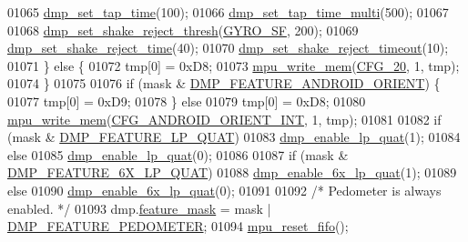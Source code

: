 \begin{DoxyCode}
01065         \hyperlink{group___d_r_i_v_e_r_s_ga97466067f4a23368f4d7e2547fe359d9}{dmp\_set\_tap\_time}(100);
01066         \hyperlink{group___d_r_i_v_e_r_s_gaeca250a90eb816eb2609229849481337}{dmp\_set\_tap\_time\_multi}(500);
01067 
01068         \hyperlink{group___d_r_i_v_e_r_s_ga62efdae1330d5bcaf4c75b069ded0ed0}{dmp\_set\_shake\_reject\_thresh}(\hyperlink{group___d_r_i_v_e_r_s_gac0325c658f2911bdfc3b44fca31c684f}{GYRO\_SF}, 200);
01069         \hyperlink{group___d_r_i_v_e_r_s_ga09d7a6d90e1bd2e907f1866d850c5608}{dmp\_set\_shake\_reject\_time}(40);
01070         \hyperlink{group___d_r_i_v_e_r_s_ga5d44d1a32535000e6902cdc5224d1b54}{dmp\_set\_shake\_reject\_timeout}(10);
01071     \} \textcolor{keywordflow}{else} \{
01072         tmp[0] = 0xD8;
01073         \hyperlink{group___d_r_i_v_e_r_s_gafea59910bc3dd30ba3356b1c75213a5f}{mpu\_write\_mem}(\hyperlink{group___d_r_i_v_e_r_s_ga12aa4c3bdc65c24ca29ef08e62fd3e13}{CFG\_20}, 1, tmp);
01074     \}
01075 
01076     \textcolor{keywordflow}{if} (mask & \hyperlink{group___d_r_i_v_e_r_s_gaf2b250fc928390d562f7bd80300ce419}{DMP\_FEATURE\_ANDROID\_ORIENT}) \{
01077         tmp[0] = 0xD9;
01078     \} \textcolor{keywordflow}{else}
01079         tmp[0] = 0xD8;
01080     \hyperlink{group___d_r_i_v_e_r_s_gafea59910bc3dd30ba3356b1c75213a5f}{mpu\_write\_mem}(\hyperlink{group___d_r_i_v_e_r_s_gacc91af9a664cf438b93a3faa108bb603}{CFG\_ANDROID\_ORIENT\_INT}, 1, tmp);
01081 
01082     \textcolor{keywordflow}{if} (mask & \hyperlink{group___d_r_i_v_e_r_s_gabf442c0477f8f7704a8094519ddfe38e}{DMP\_FEATURE\_LP\_QUAT})
01083         \hyperlink{group___d_r_i_v_e_r_s_ga4ee4339b79a58558d121ba8206056394}{dmp\_enable\_lp\_quat}(1);
01084     \textcolor{keywordflow}{else}
01085         \hyperlink{group___d_r_i_v_e_r_s_ga4ee4339b79a58558d121ba8206056394}{dmp\_enable\_lp\_quat}(0);
01086 
01087     \textcolor{keywordflow}{if} (mask & \hyperlink{group___d_r_i_v_e_r_s_gae879a3c9729f9e1be5e6d7c9211c69c0}{DMP\_FEATURE\_6X\_LP\_QUAT})
01088         \hyperlink{group___d_r_i_v_e_r_s_gaac712ef33727433f666b3861894873be}{dmp\_enable\_6x\_lp\_quat}(1);
01089     \textcolor{keywordflow}{else}
01090         \hyperlink{group___d_r_i_v_e_r_s_gaac712ef33727433f666b3861894873be}{dmp\_enable\_6x\_lp\_quat}(0);
01091 
01092     \textcolor{comment}{/* Pedometer is always enabled. */}
01093     dmp.\hyperlink{structdmp__s_ac1c048fa56b613b3223d2e66ac2c050f}{feature\_mask} = mask | \hyperlink{group___d_r_i_v_e_r_s_gabcf6a5bc9703782d711d0c6ba92ade85}{DMP\_FEATURE\_PEDOMETER};
01094     \hyperlink{group___d_r_i_v_e_r_s_gaf23e9f57c0059be6ec57862f0584de10}{mpu\_reset\_fifo}();

\end{DoxyCode}
